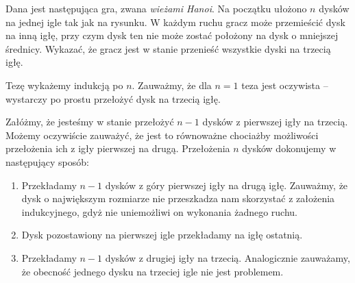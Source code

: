 \begin{problem}{3}
Dana jest następująca gra, zwana \textit{wieżami Hanoi}. Na początku ułożono $n$ dysków na jednej igle tak jak na rysunku. W każdym ruchu gracz może przemieścić dysk na inną igłę, przy czym dysk ten nie może zostać położony na dysk o mniejszej średnicy. Wykazać, że gracz jest w stanie przenieść wszystkie dyski na trzecią igłę.

\begin{center}

\end{center}

\end{problem}

\noindent
Tezę wykażemy indukcją po $n$. Zauważmy, że dla $n = 1$ teza jest oczywista -- wystarczy po prostu przełożyć dysk na trzecią igłę.

\vspace{10px}

\noindent
Załóżmy, że jesteśmy w stanie przełożyć $n - 1$ dysków z pierwszej igły na trzecią. Możemy oczywiście zauważyć, że jest to równoważne chociażby możliwości przełożenia ich z igły pierwszej na drugą.
Przełożenia $n$ dysków dokonujemy w następujący sposób:

\begin{enumerate}
	\item Przekładamy $n - 1$ dysków z góry pierwszej igły na drugą igłę. Zauważmy, że dysk o największym rozmiarze nie przeszkadza nam skorzystać z założenia indukcyjnego, gdyż nie uniemożliwi on wykonania żadnego ruchu.

	\item Dysk pozostawiony na pierwszej igle przekładamy na igłę ostatnią.

	\item Przekładamy $n - 1$ dysków z drugiej igły na trzecią. Analogicznie zauważamy, że obecność jednego dysku na trzeciej igle nie jest problemem.
\end{enumerate}

